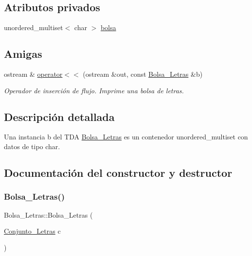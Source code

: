 \subsection*{Atributos privados}
\begin{DoxyCompactItemize}
\item 
unordered\+\_\+multiset$<$ char $>$ \hyperlink{classBolsa__Letras_a758f691f0b50cfd6c35aa09b02b6e545}{bolsa}
\end{DoxyCompactItemize}
\subsection*{Amigas}
\begin{DoxyCompactItemize}
\item 
ostream \& \hyperlink{classBolsa__Letras_a61d5cc8910f22dbb655349218d33d874}{operator$<$$<$} (ostream \&out, const \hyperlink{classBolsa__Letras}{Bolsa\+\_\+\+Letras} \&b)
\begin{DoxyCompactList}\small\item\em Operador de inserción de flujo. Imprime una bolsa de letras. \end{DoxyCompactList}\end{DoxyCompactItemize}


\subsection{Descripción detallada}
Una instancia b del T\+DA \hyperlink{classBolsa__Letras}{Bolsa\+\_\+\+Letras} es un contenedor unordered\+\_\+multiset con datos de tipo char. 

\subsection{Documentación del constructor y destructor}
\mbox{\label{classBolsa__Letras_a52db817ae18cc5dd9339c6bc6a1a88b3}} 
\subsubsection{\texorpdfstring{Bolsa\+\_\+\+Letras()}{Bolsa\_Letras()}}
{\footnotesize\ttfamily Bolsa\+\_\+\+Letras\+::\+Bolsa\+\_\+\+Letras (\begin{DoxyParamCaption}\item[{\hyperlink{classConjunto__Letras}{Conjunto\+\_\+\+Letras}}]{c }\end{DoxyParamCaption})}



